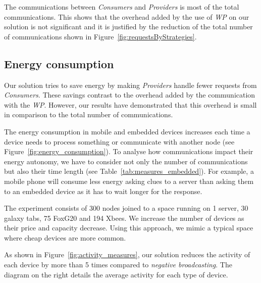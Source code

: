 The communications between \emph{Consumers} and \emph{Providers} is most of the total communications.
This shows that the overhead added by the use of \emph{WP} on our solution is not significant and it is justified by the reduction of the total number of communications shown in Figure~\ref{fig:requestsByStrategies}.





\subsection{Energy consumption}
\label{sec:energyConsumption}
Our solution tries to save energy by making \emph{Providers} handle fewer requests from \emph{Consumers}.
These savings contrast to the overhead added by the communication with the \emph{WP}.
However, our results have demonstrated that this overhead is small in comparison to the total number of communications.

The energy consumption in mobile and embedded devices increases each time a device needs to process something or communicate with another node (see Figure~\ref{fig:energy_consumption}).
To analyse how communications impact their energy autonomy, we have to consider not only the number of communications but also their time length (see Table~\ref{tab:measures_embedded}).
For example, a mobile phone will consume less energy asking clues to a server than asking them to an embedded device as it has to wait longer for the response.




The experiment consists of 300 nodes joined to a space running on 1 server, 30 galaxy tabs, 75 FoxG20 and 194 Xbees. %
We increase the number of devices as their price and capacity decrease.
Using this approach, we mimic a typical space where cheap devices are more common.

As shown in Figure~\ref{fig:activity_measures}, our solution reduces the activity of each device by more than 5 times compared to \emph{negative broadcasting}.
The diagram on the right details the average activity for each type of device.

